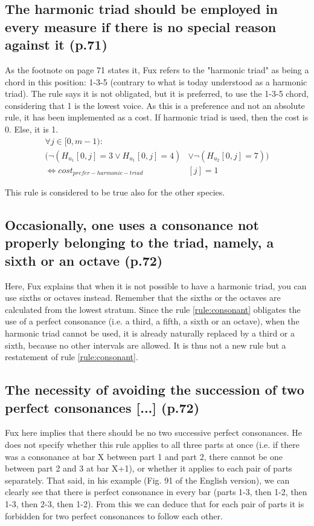 \subsection {\reddot The harmonic triad should be employed in every measure if there is no special reason against it (p.71)}
As the footnote on page 71 states it, Fux refers to the "harmonic triad" as being a chord in this position: 1-3-5 (contrary to what is today understood as a harmonic triad).
The rule says it is not obligated, but it is preferred, to use the 1-3-5 chord, considering that 1 is the lowest voice. As this is a preference and not an absolute rule, it has been implemented as a cost. If harmonic triad is used, then the cost is 0. Else, it is 1.
\begin{equation}
\begin{aligned}
\forall j \in [0, m-1) \colon &\\
(\neg (H_{u_1}[0, j] = 3 \lor H_{u_1}[0, j] = 4) &\lor \neg (H_{u_2}[0, j] = 7)) \\
\iff cost_{prefer-harmonic-triad}&[j] = 1
\end{aligned}
\end{equation}

This rule is considered to be true also for the other species.

\subsection{\reddot Occasionally, one uses a consonance not properly belonging to the triad, namely, a sixth or an octave (p.72)}
Here, Fux explains that when it is not possible to have a harmonic triad, you can use sixths or octaves instead. Remember that the sixths or the octaves are calculated from the lowest stratum. Since the rule \ref{rule:consonant} obligates the use of a perfect consonance (i.e. a third, a fifth, a sixth or an octave), when the harmonic triad cannot be used, it is already naturally replaced by a third or a sixth, because no other intervals are allowed. It is thus not a new rule but a restatement of rule \ref{rule:consonant}.

\subsection{\reddot The necessity of avoiding  the succession of two perfect consonances [...] (p.72)} \label{rule:succ-p-cons}
Fux here implies that there should be no two successive perfect consonances. He does not specify whether this rule applies to all three parts at once (i.e. if there was a consonance at bar X between part 1 and part 2, there cannot be one between part 2 and 3 at bar X+1), or whether it applies to each pair of parts separately. That said, in his example (Fig. 91 of the English version), we can clearly see that there is perfect consonance in every bar (parts 1-3, then 1-2, then 1-3, then 2-3, then 1-2). From this we can deduce that for each pair of parts it is forbidden for two perfect consonances to follow each other.

